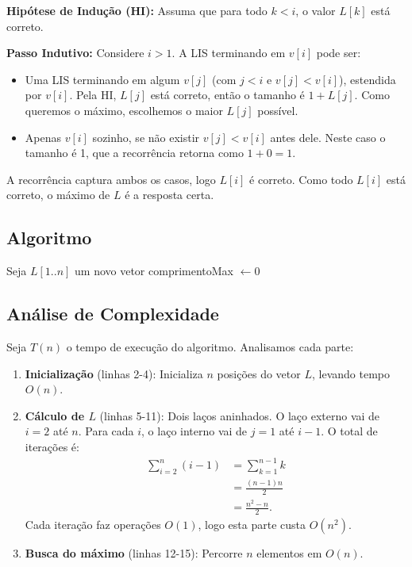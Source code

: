 \documentclass[a4paper,12pt]{article}
\begin{document}
\textbf{Hipótese de Indução (HI):} Assuma que para todo $k < i$, o valor $L[k]$ está correto.

\textbf{Passo Indutivo:} Considere $i > 1$. A LIS terminando em $v[i]$ pode ser:
\begin{itemize}
    \item Uma LIS terminando em algum $v[j]$ (com $j < i$ e $v[j] < v[i]$), estendida por $v[i]$. Pela HI, $L[j]$ está correto, então o tamanho é $1 + L[j]$. Como queremos o máximo, escolhemos o maior $L[j]$ possível.
    \item Apenas $v[i]$ sozinho, se não existir $v[j] < v[i]$ antes dele. Neste caso o tamanho é 1, que a recorrência retorna como $1+0=1$.
\end{itemize}

A recorrência captura ambos os casos, logo $L[i]$ é correto. Como todo $L[i]$ está correto, o máximo de $L$ é a resposta certa.
\subsection*{Algoritmo}
\begin{algorithm}[H]
\SetAlgoLined
\caption{\texttt{SubsequenciaCrescenteMaisLonga}$(v, n)$}
\BlankLine
Seja $L[1..n]$ um novo vetor\;
comprimentoMax $\leftarrow 0$\;
\;
\end{algorithm}

\subsection*{Análise de Complexidade}
Seja $T(n)$ o tempo de execução do algoritmo. Analisamos cada parte:

\begin{enumerate}
    \item \textbf{Inicialização} (linhas 2-4): Inicializa $n$ posições do vetor $L$, levando tempo $O(n)$.
    
    \item \textbf{Cálculo de $L$} (linhas 5-11): Dois laços aninhados. O laço externo vai de $i=2$ até $n$. Para cada $i$, o laço interno vai de $j=1$ até $i-1$. O total de iterações é:
    \begin{align*}
    \sum_{i=2}^{n} (i-1) &= \sum_{k=1}^{n-1} k \\
    &= \frac{(n-1)n}{2} \\
    &= \frac{n^2 - n}{2}.
    \end{align*}
    Cada iteração faz operações $O(1)$, logo esta parte custa $O(n^2)$.
    
    \item \textbf{Busca do máximo} (linhas 12-15): Percorre $n$ elementos em $O(n)$.
\end{enumerate}
\end{document}
